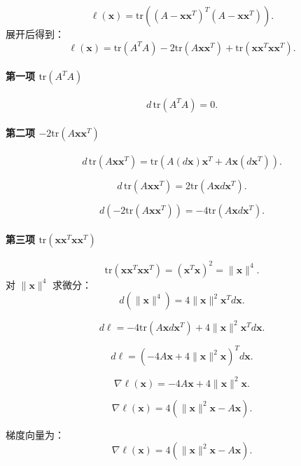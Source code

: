 
\[
\ell(\mathbf{x}) = \text{tr}\left( (A - \mathbf{x}\mathbf{x}^T)^T (A - \mathbf{x}\mathbf{x}^T) \right).
\]
展开后得到：
\[
\ell(\mathbf{x}) = \text{tr}(A^TA) - 2\text{tr}(A\mathbf{x}\mathbf{x}^T) + \text{tr}(\mathbf{x}\mathbf{x}^T\mathbf{x}\mathbf{x}^T).
\]

\paragraph{第一项 \(\text{tr}(A^TA)\)}  

\[
d\,\text{tr}(A^TA) = 0.
\]

\paragraph{第二项 \(-2\text{tr}(A\mathbf{x}\mathbf{x}^T)\)}  

\[
d\,\text{tr}(A\mathbf{x}\mathbf{x}^T) = \text{tr}(A(d\mathbf{x})\mathbf{x}^T + A\mathbf{x}(d\mathbf{x}^T)).
\]

\[
d\,\text{tr}(A\mathbf{x}\mathbf{x}^T) = 2\text{tr}(A\mathbf{x}d\mathbf{x}^T).
\]

\[
d\left(-2\text{tr}(A\mathbf{x}\mathbf{x}^T)\right) = -4\text{tr}(A\mathbf{x}d\mathbf{x}^T).
\]

\paragraph{第三项 \(\text{tr}(\mathbf{x}\mathbf{x}^T\mathbf{x}\mathbf{x}^T)\)}  

\[
\text{tr}(\mathbf{x}\mathbf{x}^T\mathbf{x}\mathbf{x}^T) = (\mathbf{x}^T\mathbf{x})^2 = \|\mathbf{x}\|^4.
\]
对 \(\|\mathbf{x}\|^4\) 求微分：
\[
d\left(\|\mathbf{x}\|^4\right) = 4\|\mathbf{x}\|^2 \mathbf{x}^T d\mathbf{x}.
\]


\[
d\ell = -4\text{tr}(A\mathbf{x}d\mathbf{x}^T) + 4\|\mathbf{x}\|^2 \mathbf{x}^T d\mathbf{x}.
\]

\[
d\ell = \left(-4A\mathbf{x} + 4\|\mathbf{x}\|^2 \mathbf{x}\right)^T d\mathbf{x}.
\]

\[
\nabla \ell(\mathbf{x}) = -4A\mathbf{x} + 4\|\mathbf{x}\|^2 \mathbf{x}.
\]

\[
\nabla \ell(\mathbf{x}) = 4\left(\|\mathbf{x}\|^2 \mathbf{x} - A\mathbf{x}\right).
\]


梯度向量为：
\[
\boxed{\nabla \ell(\mathbf{x}) = 4\left( \|\mathbf{x}\|^2 \mathbf{x} - A\mathbf{x} \right)}.
\]

